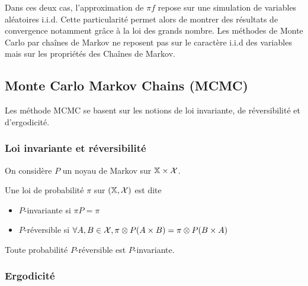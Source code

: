 \documentclass[10pt,a4paper]{article}
\begin{document}
Dans ces deux cas, l'approximation de $\pi f$ repose sur une simulation de variables aléatoires i.i.d. Cette particularité permet alors de montrer des résultats de convergence notamment grâce à la loi des grands nombre. Les méthodes de Monte Carlo par chaînes de Markov ne reposent pas sur le caractère i.i.d des variables mais sur les propriétés des Chaînes de Markov. 

\subsection{Monte Carlo Markov Chains (MCMC)}

Les méthode MCMC se basent sur les notions de loi invariante, de réversibilité et d'ergodicité.

\subsubsection{Loi invariante et réversibilité}

On considère $P$ un noyau de Markov sur $\mathbb{X} \times \mathcal{X}$.
\begin{Def}
	Une loi de probabilité $\pi$ sur $(\mathbb{X}, \mathcal{X})$ est dite
	\begin{itemize}
		\item $P$-invariante si $\pi P = \pi$
		\item $P$-réversible si $\forall A,B \in \mathcal{X}, \pi \otimes P (A \times B) = \pi \otimes P (B \times A)$
	\end{itemize}
\end{Def}

\begin{Prop}
	Toute probabilité $P$-réversible est $P$-invariante.
\end{Prop}

\subsubsection{Ergodicité}

\end{document}
